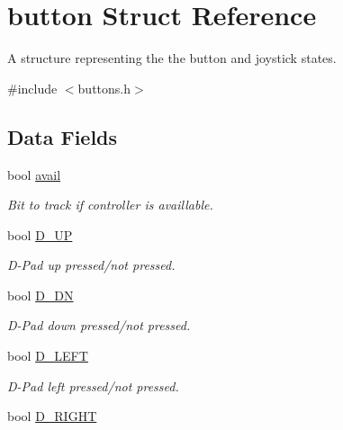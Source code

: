 \hypertarget{structbutton}{\section{button Struct Reference}
\label{structbutton}
}


A structure representing the the button and joystick states.  




{\ttfamily \#include $<$buttons.\-h$>$}

\subsection*{Data Fields}
\begin{DoxyCompactItemize}
\item 
\hypertarget{structbutton_a38f5f8c438b2382d4a1937d124d0edee}{bool \hyperlink{structbutton_a38f5f8c438b2382d4a1937d124d0edee}{avail}}\label{structbutton_a38f5f8c438b2382d4a1937d124d0edee}

\begin{DoxyCompactList}\small\item\em Bit to track if controller is availlable. \end{DoxyCompactList}\item 
\hypertarget{structbutton_a5c0a188da90fd9f779b09139f2255290}{bool \hyperlink{structbutton_a5c0a188da90fd9f779b09139f2255290}{D\-\_\-\-U\-P}}\label{structbutton_a5c0a188da90fd9f779b09139f2255290}

\begin{DoxyCompactList}\small\item\em D-\/\-Pad up pressed/not pressed. \end{DoxyCompactList}\item 
\hypertarget{structbutton_a8b7fdb4bf84a17bfb298945e1d76b81b}{bool \hyperlink{structbutton_a8b7fdb4bf84a17bfb298945e1d76b81b}{D\-\_\-\-D\-N}}\label{structbutton_a8b7fdb4bf84a17bfb298945e1d76b81b}

\begin{DoxyCompactList}\small\item\em D-\/\-Pad down pressed/not pressed. \end{DoxyCompactList}\item 
\hypertarget{structbutton_adfe927f5dd4989b3e6086d63a0698dc3}{bool \hyperlink{structbutton_adfe927f5dd4989b3e6086d63a0698dc3}{D\-\_\-\-L\-E\-F\-T}}\label{structbutton_adfe927f5dd4989b3e6086d63a0698dc3}

\begin{DoxyCompactList}\small\item\em D-\/\-Pad left pressed/not pressed. \end{DoxyCompactList}\item 
\hypertarget{structbutton_a787f4350c7b6d6f8e265d85c40bbaee9}{bool \hyperlink{structbutton_a787f4350c7b6d6f8e265d85c40bbaee9}{D\-\_\-\-R\-I\-G\-H\-T}}\label{structbutton_a787f4350c7b6d6f8e265d85c40bbaee9}


\end{DoxyCompactItemize}

